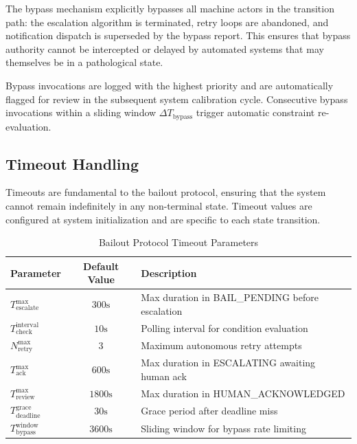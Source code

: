 The bypass mechanism explicitly bypasses all machine actors in the transition path: the escalation algorithm is terminated, retry loops are abandoned, and notification dispatch is superseded by the bypass report. This ensures that bypass authority cannot be intercepted or delayed by automated systems that may themselves be in a pathological state.

\begin{note}
Bypass invocations are logged with the highest priority and are automatically flagged for review in the subsequent system calibration cycle. Consecutive bypass invocations within a sliding window $\Delta T_{\text{bypass}}$ trigger automatic constraint re-evaluation.
\end{note}

\subsection{Timeout Handling}

Timeouts are fundamental to the bailout protocol, ensuring that the system cannot remain indefinitely in any non-terminal state. Timeout values are configured at system initialization and are specific to each state transition.

\begin{table}[htbp]
\centering
\caption{Bailout Protocol Timeout Parameters}
\label{tab:timeouts}
\begin{tabular}{lcl}
\toprule
\textbf{Parameter} & \textbf{Default Value} & \textbf{Description} \\
\midrule
$T_{\text{escalate}}^{\max}$ & $300\text{s}$ & Max duration in BAIL\_PENDING before escalation \\
$T_{\text{check}}^{\text{interval}}$ & $10\text{s}$ & Polling interval for condition evaluation \\
$N_{\text{retry}}^{\max}$ & $3$ & Maximum autonomous retry attempts \\
$T_{\text{ack}}^{\max}$ & $600\text{s}$ & Max duration in ESCALATING awaiting human ack \\
$T_{\text{review}}^{\max}$ & $1800\text{s}$ & Max duration in HUMAN\_ACKNOWLEDGED \\
$T_{\text{deadline}}^{\text{grace}}$ & $30\text{s}$ & Grace period after deadline miss \\
\midrule
$T_{\text{bypass}}^{\text{window}}$ & $3600\text{s}$ & Sliding window for bypass rate limiting \\
\bottomrule
\end{tabular}
\end{table}

